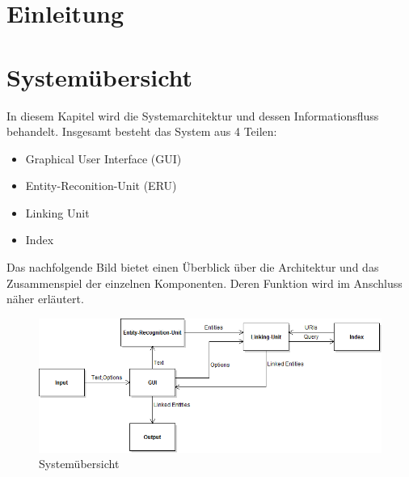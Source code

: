 \documentclass[11pt, a4paper, oneside]{Thesis} %
\begin{document}
\chapter{Einleitung}
\label{Kapitel 1}

\chapter{System\"ubersicht}
\label{Kapitel 2}

In diesem Kapitel wird die Systemarchitektur und dessen Informationsfluss behandelt. Insgesamt besteht das System aus 4 Teilen:
\begin{itemize}
\item Graphical User Interface (GUI)
\item Entity-Reconition-Unit (ERU)
\item Linking Unit
\item Index
\end{itemize}
Das nachfolgende Bild bietet einen \"Uberblick \"uber die Architektur und das Zusammenspiel der einzelnen Komponenten. Deren Funktion wird im Anschluss n\"aher erl\"autert.
\begin{figure}[ht]
\centering
\includegraphics[scale=0.55]{./system.png}
\caption[System\"ubersicht]{System\"ubersicht}
\end{figure}
\end{document}
